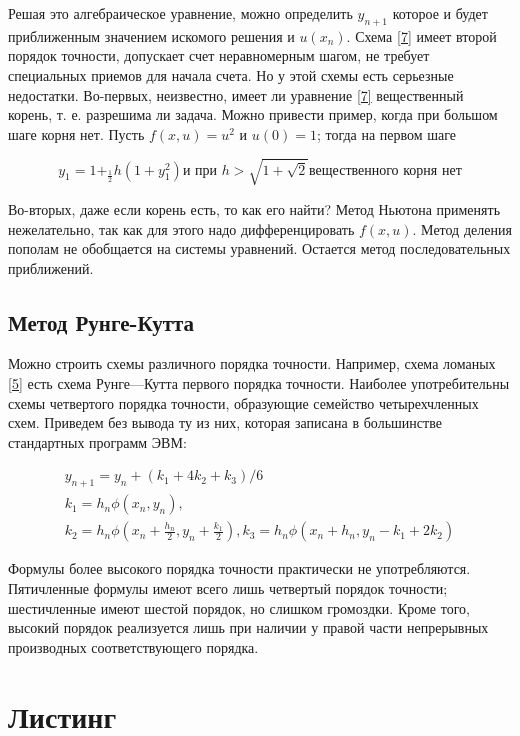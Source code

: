 \documentclass[12pt,a4paper]{scrartcl}
\begin{document}
	Решая это алгебраическое уравнение, можно определить $y_{n+1}$ которое и будет приближенным значением искомого решения и $u(x_n)$. Схема \ref{7} имеет второй порядок точности, допускает счет неравномерным шагом, не требует специальных приемов для начала счета. Но у этой схемы есть серьезные недостатки. Во-первых, неизвестно, имеет ли уравнение \ref{7} вещественный корень, т. е. разрешима ли задача. Можно привести пример, когда при большом шаге корня нет. Пусть $f(x, u) = u^2$ и $u(0) = 1$; тогда на первом шаге
	
	\begin{equation*}
		y_1 = 1 +_\frac{1}{2}h(1 + y_1^2) \text{и при } h > \sqrt{1 + \sqrt{2}} \text{вещественного корня нет}
	\end{equation*}
	
	Во-вторых, даже если корень есть, то как его найти? Метод Ньютона применять нежелательно, так как для этого надо дифференцировать $f(x, u)$. Метод деления пополам не обобщается на системы уравнений. Остается метод последовательных приближений.
	
	\subsection{Метод Рунге-Кутта}
	Можно строить схемы различного порядка точности. Например, схема
	ломаных \ref{5} есть схема Рунге—Кутта первого порядка точности. Наиболее
	употребительны схемы четвертого порядка точности, образующие семейство
	четырехчленных схем. Приведем без вывода ту из них, которая записана в
	большинстве стандартных программ ЭВМ:
	
	\begin{gather*}
			y_{n+1} = y_n + (k_1 + 4k_2 + k_3) / 6 \\
			k_1 = h_n\phi(x_n,y_n), \\
			k_2 = h_n\phi(x_n + \frac{h_n}{2}, y_n + \frac{k_1}{2}),
			k_3 = h_n\phi(x_n + h_n, y_n - k_1 + 2k_2)
	\end{gather*}
	
	Формулы более высокого порядка точности практически не употребляются. Пятичленные формулы имеют всего лишь четвертый порядок точности; шестичленные имеют шестой порядок, но слишком громоздки. Кроме того, высокий порядок реализуется лишь при наличии у правой части непрерывных производных соответствующего порядка.
	
	\section{Листинг}
	
\end{document}
